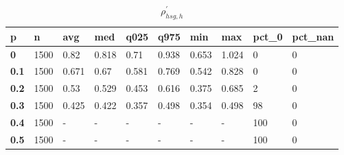 \begin{table}[h]
 \centering 
\footnotesize
\caption{$\rho_{hsg,h}^\prime $}
\label{tab:alphahsgh}
\begin{tabular}[h]{|l|l|l|l|l|l|l|l|l|l|
    } \hline
\textbf{ p} & \textbf{ n} & \textbf{ avg} & \textbf{ med} & \textbf{ q025} & \textbf{ q975} & \textbf{ min} & \textbf{ max} & \textbf{ pct\_0} & \textbf{ pct\_nan}
    \\ \hline
  \textbf{  0} & 1500 &  0.82 & 0.818 &  0.71 & 0.938 & 0.653 & 1.024 &   0 & 0
    \\ \hline
  \textbf{0.1} & 1500 & 0.671 &  0.67 & 0.581 & 0.769 & 0.542 & 0.828 &   0 & 0
    \\ \hline
  \textbf{0.2} & 1500 &  0.53 & 0.529 & 0.453 & 0.616 & 0.375 & 0.685 &   2 & 0
    \\ \hline
  \textbf{0.3} & 1500 & 0.425 & 0.422 & 0.357 & 0.498 & 0.354 & 0.498 &  98 & 0
    \\ \hline
  \textbf{0.4} & 1500 & - & - & - & - & - & - & 100 & 0
    \\ \hline
  \textbf{0.5} & 1500 & - & - & - & - & - & - & 100 & 0
    \\ \hline
 \end{tabular}
 \end{table}
